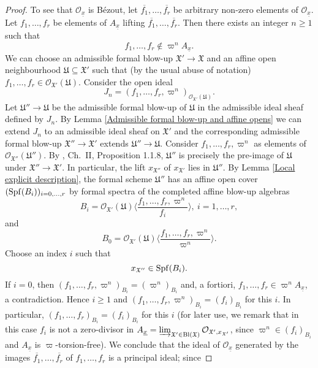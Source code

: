 \documentclass[12pt,twoside,a4paper]{article}
\theoremstyle{definition}
\theoremstyle{remark}
\newcommand\Bl{{\rm Bl}}
\newcommand\Spf{{\rm Spf}}
\begin{document}
\begin{proof}
To see that $\mathcal{O}_{\underline{x}}$ is Bézout, let $\overline{f_1},\dots, \overline{f_r}$ be arbitrary non-zero elements of $\mathcal{O}_{\underline{x}}$. Let $f_1,\dots, f_r$ be elements of $A_{\underline{x}}$ lifting $\overline{f_1},\dots, \overline{f_r}$. Then there exists an integer $n\geq 1$ such that \begin{equation*}f_1,\dots, f_r\not\in \varpi^{n}A_{\underline{x}}.\end{equation*}We can choose an admissible formal blow-up $\mathfrak{X}'\to\mathfrak{X}$ and an affine open neighbourhood $\mathfrak{U}\subseteq \mathfrak{X}'$ such that (by the usual abuse of notation) $f_1,\dots, f_r\in\mathcal{O}_{\mathfrak{X}'}(\mathfrak{U})$. Consider the open ideal \begin{equation*}J_{n}=(f_1,\dots, f_r, \varpi^{n})_{\mathcal{O}_{\mathfrak{X}'}(\mathfrak{U})}.\end{equation*}Let $\mathfrak{U}''\to \mathfrak{U}$ be the admissible formal blow-up of $\mathfrak{U}$ in the admissible ideal sheaf defined by $J_{n}$. By Lemma \ref{Admissible formal blow-up and affine opens} we can extend $J_{n}$ to an admissible ideal sheaf on $\mathfrak{X}'$ and the corresponding admissible formal blow-up $\mathfrak{X}''\to\mathfrak{X}'$ extends $\mathfrak{U}''\to \mathfrak{U}$. Consider $f_1,\dots, f_r, \varpi^{n}$ as elements of $\mathcal{O}_{\mathfrak{X}''}(\mathfrak{U}'')$. By \cite{FK}, Ch.~II, Proposition 1.1.8, $\mathfrak{U}''$ is precisely the pre-image of $\mathfrak{U}$ under $\mathfrak{X}''\to \mathfrak{X}'$. In particular, the lift $x_{\mathfrak{X}''}$ of $x_{\mathfrak{X}'}$ lies in $\mathfrak{U}''$. By Lemma \ref{Local explicit description}, the formal scheme $\mathfrak{U}''$ has an affine open cover $(\Spf(B_{i}))_{i=0,\dots, r}$ by formal spectra of the completed affine blow-up algebras\begin{equation*}B_{i}=\mathcal{O}_{\mathfrak{X}'}(\mathfrak{U})\langle\frac{f_1,\dots, f_r, \varpi^{n}}{f_i}\rangle, \ i=1,\dots, r,\end{equation*}and \begin{equation*}B_{0}=\mathcal{O}_{\mathfrak{X}'}(\mathfrak{U})\langle\frac{f_1,\dots, f_r,\varpi^{n}}{\varpi^{n}}\rangle.\end{equation*}Choose an index $i$ such that \begin{equation*}x_{\mathfrak{X}''}\in \Spf(B_{i}).\end{equation*}If $i=0$, then $(f_1,\dots, f_r,\varpi^{n})_{B_{i}}=(\varpi^{n})_{B_{i}}$ and, a fortiori, $f_1,\dots, f_r\in \varpi^{n}A_{\underline{x}}$, a contradiction. Hence $i\geq 1$ and $(f_1,\dots, f_r,\varpi^{n})_{B_{i}}=(f_{i})_{B_{i}}$ for this $i$. In particular, $(f_1,\dots, f_r)_{B_{i}}=(f_{i})_{B_{i}}$ for this $i$ (for later use, we remark that in this case $f_{i}$ is not a zero-divisor in $A_{\underline{x}}=\varinjlim_{\mathfrak{X'}\in\Bl(\mathfrak{X})}\mathcal{O}_{\mathfrak{X}',x_{\mathfrak{X}'}}$, since $\varpi^{n}\in (f_{i})_{B_{i}}$ and $A_{\underline{x}}$ is $\varpi$-torsion-free). We conclude that the ideal of $\mathcal{O}_{\underline{x}}$ generated by the images $\overline{f_1},\dots, \overline{f_r}$ of $f_1,\dots, f_r$ is a principal ideal; since 
\end{proof}
\end{document}
